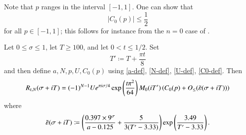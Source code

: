 Note that $p$ ranges in the interval $[-1,1]$.  One can show that 
\begin{equation}\label{cop}
|C_0(p)| \leq \frac{1}{2}
\end{equation}
for all $p \in [-1,1]$; this follows for instance from the $n=0$ case of \cite[Theorem 6.1]{arias}.


\begin{proposition}\label{RTN-prop}  Let $0 \leq \sigma \leq 1$, let $T \geq 100$, and let $0 < t \leq 1/2$.  Set
$$ T' \coloneqq T + \frac{\pi t}{8} $$
and then define $a,N,p,U,C_0(p)$ using \eqref{a-def}, \eqref{N-def}, \eqref{U-def}, \eqref{C0-def}.
Then 
$$
 R_{t,N}(\sigma+iT) = (-1)^{N-1} U e^{\pi i \sigma/4} \exp\left( \frac{t \pi^2}{64}\right) M_0(iT') \left( C_0(p) + O_{\leq}( \tilde {\varepsilon}(\sigma+iT))\right)$$
where
\begin{equation}\label{epsp-def}
 \tilde {\varepsilon}(\sigma+iT) \coloneqq \left(\frac{0.397 \times 9^\sigma}{a-0.125} + \frac{5}{3(T'-3.33)}\right) \exp\left( \frac{3.49}{T'-3.33} \right).
\end{equation}
\end{proposition}

